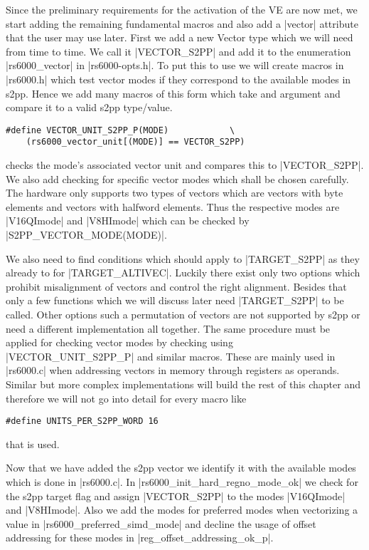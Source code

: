 Since the preliminary requirements for the activation of the VE are now met, we start adding the remaining fundamental macros and also add a |vector| attribute that the user may use later.
First we add a new Vector type which we will need from time to time.
We call it |VECTOR_S2PP| and add it to the enumeration |rs6000_vector| in |rs6000-opts.h|.
To put this to use we will create macros in |rs6000.h| which test vector modes if they correspond to the available modes in s2pp.
Hence we add many macros of this form which take and argument and compare it to a valid s2pp type/value.
\begin{lstlisting}
#define VECTOR_UNIT_S2PP_P(MODE)            \
    (rs6000_vector_unit[(MODE)] == VECTOR_S2PP)
\end{lstlisting}
checks the mode's associated vector unit and compares this to |VECTOR_S2PP|.
We also add checking for specific vector modes which shall be chosen carefully.
The hardware only supports two types of vectors which are vectors with byte elements and vectors with halfword elements.
Thus the respective modes are |V16QImode| and |V8HImode| which can be checked by |S2PP_VECTOR_MODE(MODE)|.

We also need to find conditions which should apply to |TARGET_S2PP| as they already to for |TARGET_ALTIVEC|.
Luckily there exist only two options which prohibit misalignment of vectors and control the right alignment.
Besides that only a few functions which we will discuss later need |TARGET_S2PP| to be called.
Other options such a permutation of vectors are not supported by s2pp or need a different implementation all together.
The same procedure must be applied for checking vector modes by checking using |VECTOR_UNIT_S2PP_P| and similar macros.
These are mainly used in |rs6000.c| when addressing vectors in memory through registers as operands.
Similar but more complex implementations will build the rest of this chapter and therefore we will not go into detail for every macro like
\begin{lstlisting}
#define UNITS_PER_S2PP_WORD 16
\end{lstlisting} 
that is used.

Now that we have added the s2pp vector we identify it with the available modes which is done in |rs6000.c|.
In |rs6000_init_hard_regno_mode_ok| we check for the s2pp target flag and assign |VECTOR_S2PP| to the modes |V16QImode| and |V8HImode|.
Also we add the modes for preferred modes when vectorizing a value in |rs6000_preferred_simd_mode| and decline the usage of offset addressing for these modes in |reg_offset_addressing_ok_p|.

